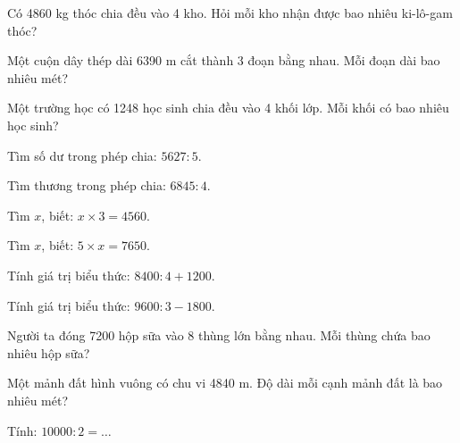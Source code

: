 \begin{ex}
Có 4860 kg thóc chia đều vào 4 kho. Hỏi mỗi kho nhận được bao nhiêu ki-lô-gam thóc?
\end{ex}

\begin{ex}
Một cuộn dây thép dài 6390 m cắt thành 3 đoạn bằng nhau. Mỗi đoạn dài bao nhiêu mét?
\end{ex}

\begin{ex}
Một trường học có 1248 học sinh chia đều vào 4 khối lớp. Mỗi khối có bao nhiêu học sinh?
\end{ex}

\begin{ex}
Tìm số dư trong phép chia: $5627 : 5$.
\end{ex}

\begin{ex}
Tìm thương trong phép chia: $6845 : 4$.
\end{ex}

\begin{ex}
Tìm $x$, biết: $x \times 3 = 4560$.
\end{ex}

\begin{ex}
Tìm $x$, biết: $5 \times x = 7650$.
\end{ex}

\begin{ex}
Tính giá trị biểu thức: $8400 : 4 + 1200$.
\end{ex}

\begin{ex}
Tính giá trị biểu thức: $9600 : 3 - 1800$.
\end{ex}

\begin{ex}
Người ta đóng 7200 hộp sữa vào 8 thùng lớn bằng nhau. Mỗi thùng chứa bao nhiêu hộp sữa?
\end{ex}

\begin{ex}
Một mảnh đất hình vuông có chu vi 4840 m. Độ dài mỗi cạnh mảnh đất là bao nhiêu mét?
\end{ex}

\begin{ex}
Tính: $10000 : 2 = \dots$
\end{ex}
